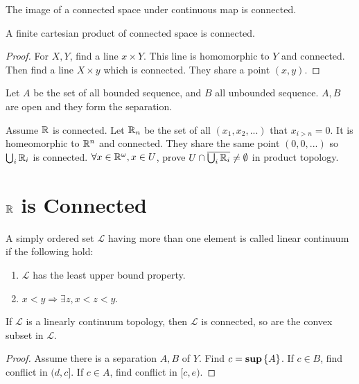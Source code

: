 \begin{theorem}
The image of a connected space under continuous map is connected.    
\end{theorem}

\begin{theorem}
A finite cartesian product of connected space is connected.
\end{theorem}
\begin{proof}
For $X,Y$, find a line $x \times Y$. This line is homomorphic to $Y$ and connected. Then find a line $X \times y$ which is connected. They share a point $(x,y)$.
\end{proof}

\begin{example}
    Let $A$ be the set of all bounded sequence, and $B$ all unbounded sequence. $A,B$ are open and they form the separation.
\end{example}

\begin{example}
    Assume $\mathbb{R}$ is connected. Let $\mathbb{R}_n$ be the set of all $(x_1, x_2, ...)$ that $x_{i > n} = 0$. It is homeomorphic to $\mathbb{R}^n$ and connected. They share the same point $(0,0,...)$ so $\bigcup_i \mathbb{R}_i$ is connected. $\forall x \in \mathbb{R}^\omega, x \in U$, prove $U \cap \overline{\bigcup_i \mathbb{R}_i} \neq \emptyset$ in product topology.
\end{example}


\section{$\mathbb{R}$ is Connected}

\begin{definition}
    A simply ordered set $\mathcal{L}$ having more than one element is called linear continuum if the following hold:
    \begin{enumerate}
        \item $\mathcal{L}$ has the least upper bound property.
        \item $x < y \Rightarrow \exists z, x < z < y$.
    \end{enumerate}
\end{definition}

\begin{theorem}
    If $\mathcal{L}$ is a linearly continuum topology, then $\mathcal{L}$ is connected, so are the convex subset in $\mathcal{L}$.
\end{theorem}
\begin{proof}
    Assume there is a separation $A,B$ of $Y$. Find $c = \mathbf{sup} \set{A}$. If $c \in B$, find conflict in $(d, c]$. If $c \in A$, find conflict in $[c, e)$.
\end{proof}

